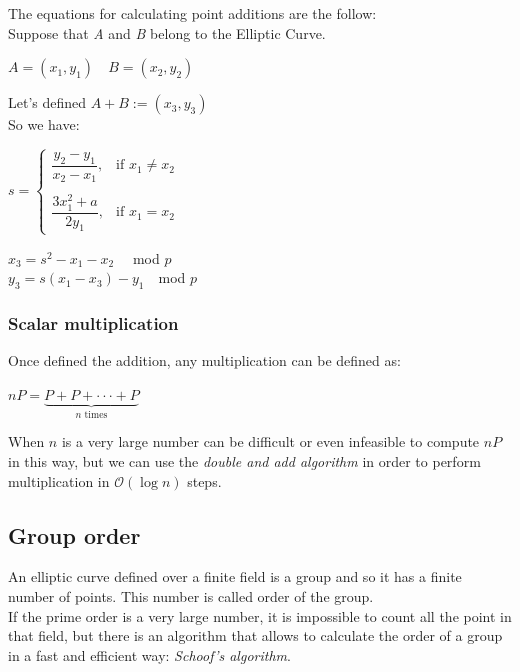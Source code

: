 The equations for calculating point additions are the follow: \\
Suppose that \textit{A} and \textit{B} belong to the Elliptic Curve.

\begin{center}
	$ A=(x_1,y_1) \quad B=(x_2,y_2)$
\end{center}
Let's defined $ A+B :=(x_3,y_3) $ \\
So we have: 

\begin{center} 
	$s=\begin{cases} \dfrac{y_2-y_1}{x_2-x_1}, & \mbox{if } x_1\neq x_2 \\ \\ \dfrac{3x_1^2+a}{2y_1}, & \mbox{if } x_1= x_2\end{cases}$ 
\end{center}
\begin{center} 
	$ x_3=s^2-x_1-x_2  \quad$ mod $p$\\
	$y_3=s(x_1-x_3)-y_1  \quad$mod $p$
\end{center}

\subsubsection{Scalar multiplication}
Once defined the addition, any multiplication can be defined as:
\begin{center} 
	$ nP=\underbrace{
		P+P+\cdot \cdot \cdot+P
	}_{n\text{ times}}$
\end{center}
When $n$ is a very large number can be difficult or even infeasible to compute $nP$ in this way, but we can use the \textit{double and add algorithm} in order to perform multiplication in $\mathcal{O}(\log{}n)$ steps.

\subsection{Group order}
An elliptic curve defined over a finite field is a group and so it has a finite number of points. This number is called order of the group.\\
If the prime order is a very large number, it is impossible to count all the point in that field, but there is an algorithm that allows to calculate the order of a group in a fast and efficient way: \textit{Schoof's algorithm}.


